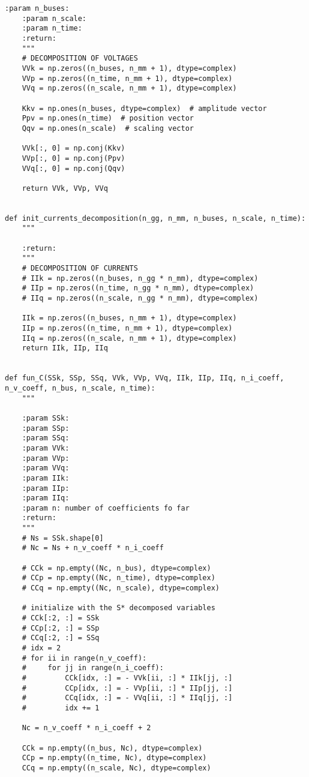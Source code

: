\begin{lstlisting}[caption={Proper Generalized Decomposition code in Python}]
    :param n_buses:
    :param n_scale:
    :param n_time:
    :return:
    """
    # DECOMPOSITION OF VOLTAGES
    VVk = np.zeros((n_buses, n_mm + 1), dtype=complex)
    VVp = np.zeros((n_time, n_mm + 1), dtype=complex)
    VVq = np.zeros((n_scale, n_mm + 1), dtype=complex)

    Kkv = np.ones(n_buses, dtype=complex)  # amplitude vector
    Ppv = np.ones(n_time)  # position vector
    Qqv = np.ones(n_scale)  # scaling vector

    VVk[:, 0] = np.conj(Kkv)
    VVp[:, 0] = np.conj(Ppv)
    VVq[:, 0] = np.conj(Qqv)

    return VVk, VVp, VVq


def init_currents_decomposition(n_gg, n_mm, n_buses, n_scale, n_time):
    """

    :return:
    """
    # DECOMPOSITION OF CURRENTS
    # IIk = np.zeros((n_buses, n_gg * n_mm), dtype=complex)
    # IIp = np.zeros((n_time, n_gg * n_mm), dtype=complex)
    # IIq = np.zeros((n_scale, n_gg * n_mm), dtype=complex)

    IIk = np.zeros((n_buses, n_mm + 1), dtype=complex)
    IIp = np.zeros((n_time, n_mm + 1), dtype=complex)
    IIq = np.zeros((n_scale, n_mm + 1), dtype=complex)
    return IIk, IIp, IIq


def fun_C(SSk, SSp, SSq, VVk, VVp, VVq, IIk, IIp, IIq, n_i_coeff, n_v_coeff, n_bus, n_scale, n_time):
    """

    :param SSk:
    :param SSp:
    :param SSq:
    :param VVk:
    :param VVp:
    :param VVq:
    :param IIk:
    :param IIp:
    :param IIq:
    :param n: number of coefficients fo far
    :return:
    """
    # Ns = SSk.shape[0]
    # Nc = Ns + n_v_coeff * n_i_coeff

    # CCk = np.empty((Nc, n_bus), dtype=complex)
    # CCp = np.empty((Nc, n_time), dtype=complex)
    # CCq = np.empty((Nc, n_scale), dtype=complex)
    
    # initialize with the S* decomposed variables
    # CCk[:2, :] = SSk
    # CCp[:2, :] = SSp
    # CCq[:2, :] = SSq
    # idx = 2
    # for ii in range(n_v_coeff):
    #     for jj in range(n_i_coeff):
    #         CCk[idx, :] = - VVk[ii, :] * IIk[jj, :]
    #         CCp[idx, :] = - VVp[ii, :] * IIp[jj, :]
    #         CCq[idx, :] = - VVq[ii, :] * IIq[jj, :]
    #         idx += 1

    Nc = n_v_coeff * n_i_coeff + 2

    CCk = np.empty((n_bus, Nc), dtype=complex)
    CCp = np.empty((n_time, Nc), dtype=complex)
    CCq = np.empty((n_scale, Nc), dtype=complex)


\end{lstlisting}
